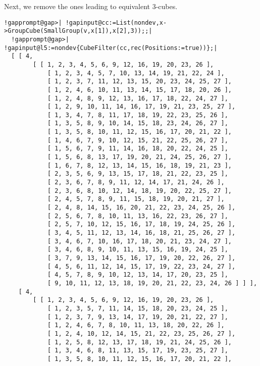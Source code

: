 \documentclass[a4paper,11pt]{report}
\begin{document}
{{ Next, we remove the ones leading to equivalent 3-cubes. 
\begin{Verbatim}[commandchars=!@|,fontsize=\small,frame=single,label=Example]
  !gapprompt@gap>| !gapinput@cc:=List(nondev,x->GroupCube(SmallGroup(v,x[1]),x[2],3));;|
  !gapprompt@gap>| !gapinput@l5:=nondev{CubeFilter(cc,rec(Positions:=true))};|
  [ [ 4, 
        [ [ 1, 2, 3, 4, 5, 6, 9, 12, 16, 19, 20, 23, 26 ], 
            [ 1, 2, 3, 4, 5, 7, 10, 13, 14, 19, 21, 22, 24 ], 
            [ 1, 2, 3, 7, 11, 12, 13, 15, 20, 23, 24, 25, 27 ], 
            [ 1, 2, 4, 6, 10, 11, 13, 14, 15, 17, 18, 20, 26 ], 
            [ 1, 2, 4, 8, 9, 12, 13, 16, 17, 18, 22, 24, 27 ], 
            [ 1, 2, 9, 10, 11, 14, 16, 17, 19, 21, 23, 25, 27 ], 
            [ 1, 3, 4, 7, 8, 11, 17, 18, 19, 22, 23, 25, 26 ], 
            [ 1, 3, 5, 8, 9, 10, 14, 15, 18, 23, 24, 26, 27 ], 
            [ 1, 3, 5, 8, 10, 11, 12, 15, 16, 17, 20, 21, 22 ], 
            [ 1, 4, 6, 7, 9, 10, 12, 15, 21, 22, 25, 26, 27 ], 
            [ 1, 5, 6, 7, 9, 11, 14, 16, 18, 20, 22, 24, 25 ], 
            [ 1, 5, 6, 8, 13, 17, 19, 20, 21, 24, 25, 26, 27 ], 
            [ 1, 6, 7, 8, 12, 13, 14, 15, 16, 18, 19, 21, 23 ], 
            [ 2, 3, 5, 6, 9, 13, 15, 17, 18, 21, 22, 23, 25 ], 
            [ 2, 3, 6, 7, 8, 9, 11, 12, 14, 17, 21, 24, 26 ], 
            [ 2, 3, 6, 8, 10, 12, 14, 18, 19, 20, 22, 25, 27 ], 
            [ 2, 4, 5, 7, 8, 9, 11, 15, 18, 19, 20, 21, 27 ], 
            [ 2, 4, 8, 14, 15, 16, 20, 21, 22, 23, 24, 25, 26 ], 
            [ 2, 5, 6, 7, 8, 10, 11, 13, 16, 22, 23, 26, 27 ], 
            [ 2, 5, 7, 10, 12, 15, 16, 17, 18, 19, 24, 25, 26 ], 
            [ 3, 4, 5, 11, 12, 13, 14, 16, 18, 21, 25, 26, 27 ], 
            [ 3, 4, 6, 7, 10, 16, 17, 18, 20, 21, 23, 24, 27 ], 
            [ 3, 4, 6, 8, 9, 10, 11, 13, 15, 16, 19, 24, 25 ], 
            [ 3, 7, 9, 13, 14, 15, 16, 17, 19, 20, 22, 26, 27 ], 
            [ 4, 5, 6, 11, 12, 14, 15, 17, 19, 22, 23, 24, 27 ], 
            [ 4, 5, 7, 8, 9, 10, 12, 13, 14, 17, 20, 23, 25 ], 
            [ 9, 10, 11, 12, 13, 18, 19, 20, 21, 22, 23, 24, 26 ] ] ], 
    [ 4, 
        [ [ 1, 2, 3, 4, 5, 6, 9, 12, 16, 19, 20, 23, 26 ], 
            [ 1, 2, 3, 5, 7, 11, 14, 15, 18, 20, 23, 24, 25 ], 
            [ 1, 2, 3, 7, 9, 13, 14, 17, 19, 20, 21, 22, 27 ], 
            [ 1, 2, 4, 6, 7, 8, 10, 11, 13, 18, 20, 22, 26 ], 
            [ 1, 2, 4, 10, 12, 14, 15, 21, 22, 23, 25, 26, 27 ], 
            [ 1, 2, 5, 8, 12, 13, 17, 18, 19, 21, 24, 25, 26 ], 
            [ 1, 3, 4, 6, 8, 11, 13, 15, 17, 19, 23, 25, 27 ], 
            [ 1, 3, 5, 8, 10, 11, 12, 15, 16, 17, 20, 21, 22 ], 

\end{Verbatim}}}
\end{document}
